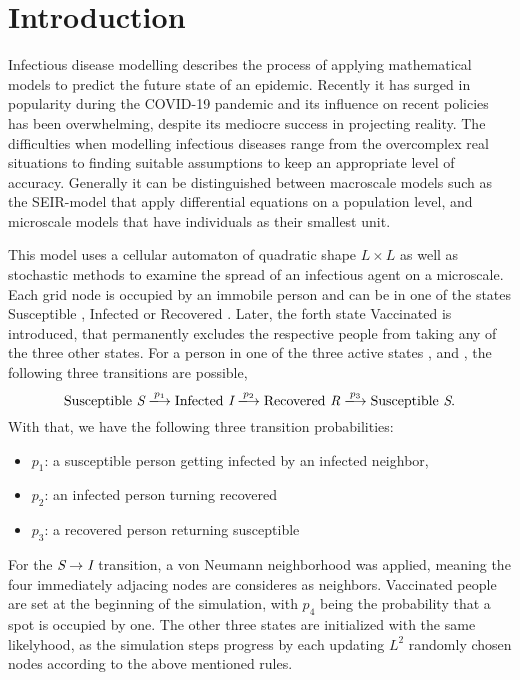\section{Introduction}


Infectious disease modelling describes the process of applying mathematical models to predict the future state of an epidemic. 
Recently it has surged in popularity during the COVID-19 pandemic and its influence on recent policies has been overwhelming, despite its mediocre success in projecting reality. 
The difficulties when modelling infectious diseases range from the overcomplex real situations to finding suitable assumptions to keep an appropriate level of accuracy.
Generally it can be distinguished between macroscale models such as the SEIR-model\cite{SEIR_Heidelberg} that apply differential equations on a population level, 
and microscale models that have individuals as their smallest unit.

This model uses a cellular automaton\cite{CellularAutomaton} of quadratic shape $L\times L$ as well as stochastic methods to examine the spread of an infectious agent on a microscale. 
Each grid node is occupied by an immobile person and can be in one of the states Susceptible \susceptible{}, Infected \infected{} or Recovered \recovered{}. Later, the forth state Vaccinated \vaccinated{} is introduced, 
that permanently excludes the respective people from taking any of the three other states. 
For a person in one of the three active states \susceptible{}, \infected{} and \recovered{}, the following three transitions are possible,
\begin{equation*}
    \mathrm{Susceptible}~\susceptible\xlongrightarrow{p_1}\mathrm{Infected}~\infected{}\xlongrightarrow{p_2}\mathrm{Recovered}~\recovered{}\xlongrightarrow{p_3}\mathrm{Susceptible}~\susceptible{}.
\end{equation*}
With that, we have the following three transition probabilities:
\begin{itemize}
    \item $p_1$: a susceptible person getting infected by an infected neighbor,
    \item $p_2$: an infected person turning recovered
    \item $p_3$: a recovered person returning susceptible
\end{itemize}
For the $\textit{S}{}\rightarrow\textit{I}{}$ transition, a von Neumann neighborhood was applied, meaning the four immediately adjacing nodes are consideres as neighbors.\cite{CellularAutomaton} 
Vaccinated people \vaccinated{} are set at the beginning of the simulation, with $p_4$ being the probability that a spot is occupied by one. The other three states are initialized with the same likelyhood, as the 
simulation steps progress by each updating $L^2$ randomly chosen nodes according to the above mentioned rules.

